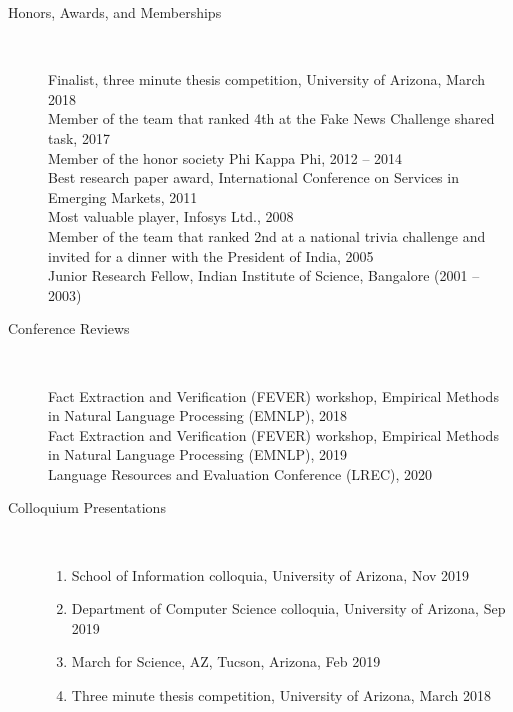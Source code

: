 \documentclass[10pt]{article}
\begin{document}
\begin{description}
\vspace{-.3cm}
\item [Honors, Awards, and Memberships]\

Finalist, three minute thesis competition, University of Arizona, March 2018\\
Member of the team that ranked 4th at the Fake News Challenge shared task, 2017\\
Member of the honor society Phi Kappa Phi, 2012 -- 2014\\
Best research paper award, International Conference on Services in Emerging Markets, 2011\\
Most valuable player,  Infosys  Ltd., 2008\\
Member of the team that ranked 2nd at a national trivia challenge and invited for a dinner with the President of India, 2005\\
Junior Research Fellow, Indian Institute of Science, Bangalore (2001 – 2003)\\




\vspace{-.4cm}\item [Conference Reviews]\ 

Fact Extraction and Verification (FEVER) workshop, Empirical Methods in Natural Language Processing (EMNLP), 2018\\
Fact Extraction and Verification (FEVER) workshop, Empirical Methods in Natural Language Processing (EMNLP), 2019\\
Language Resources and Evaluation Conference (LREC), 2020\\





\item [Colloquium Presentations]\

\begin{enumerate}

\item School of Information colloquia, University of Arizona, Nov 2019
\item Department of Computer Science colloquia, University of Arizona, Sep 2019
\item March for Science, AZ, Tucson, Arizona, Feb 2019
\item Three minute thesis competition, University of Arizona, March 2018

\end{enumerate}



\end{description}
\end{document}
